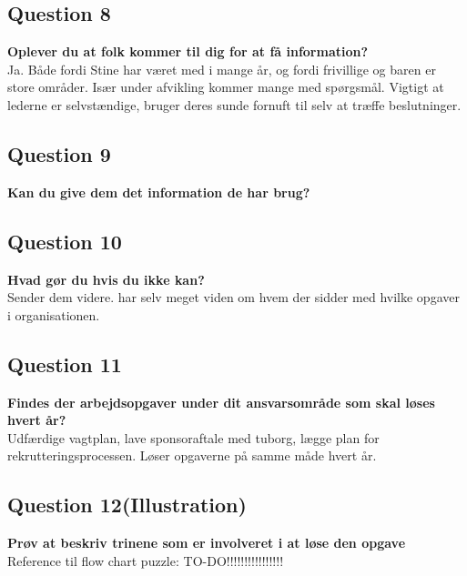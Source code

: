 \subsection{Question 8}
\label{i4q8}
\noindent \textbf{Oplever du at folk kommer til dig for at få information?} \\
Ja. Både fordi Stine har været med i mange år, og fordi frivillige og baren er store områder. Især under afvikling kommer mange med spørgsmål. Vigtigt at lederne er selvstændige, bruger deres sunde fornuft til selv at træffe beslutninger. 

\subsection{Question 9}
\label{i4q9}
\noindent \textbf{Kan du give dem det information de har brug?} \\

\subsection{Question 10}
\label{i4q10}
\noindent \textbf{Hvad gør du hvis du ikke kan?} \\
Sender dem videre. har selv meget viden om hvem der sidder med hvilke opgaver i organisationen.

\subsection{Question 11}
\label{i4q11}
\noindent \textbf{Findes der arbejdsopgaver under dit ansvarsområde som skal løses hvert år?} \\
Udfærdige vagtplan, lave sponsoraftale med tuborg, lægge plan for rekrutteringsprocessen. Løser opgaverne på samme måde hvert år.

\subsection{Question 12(Illustration)}
\label{i4q12}
\noindent \textbf{Prøv at beskriv trinene som er involveret i at løse den opgave} \\
Reference til flow chart puzzle: TO-DO!!!!!!!!!!!!!!!!